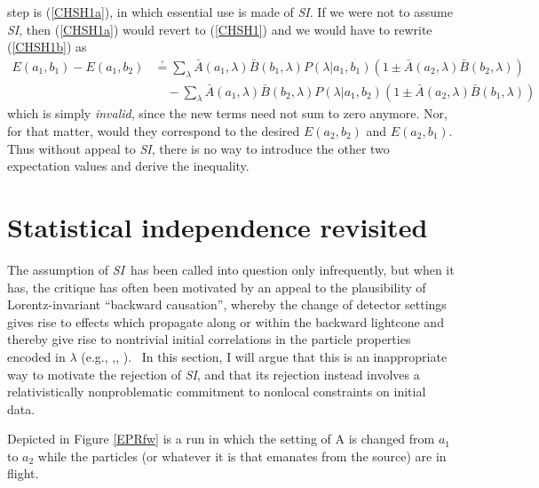 \documentclass[12pt]{article}%
\begin{document}
step is (\ref{CHSH1a}), in which essential use is made of \emph{SI}. If we
were not to assume \emph{SI}, then (\ref{CHSH1a}) would revert to
(\ref{CHSH1}) and we would have to rewrite (\ref{CHSH1b}) as
\begin{align}
E(a_{1},b_{1})-E(a_{1},b_{2})%
& \stackrel{_?}{=} %
{\displaystyle\sum\limits_{\lambda}}
\bar{A}(a_{1},\lambda)\bar{B}(b_{1},\lambda)P(\lambda|a_{1},b_{1})(1\pm\bar
{A}(a_{2},\lambda)\bar{B}(b_{2},\lambda))\nonumber\\
& \quad - 
{\displaystyle\sum\limits_{\lambda}}
\bar{A}(a_{1},\lambda)\bar{B}(b_{2},\lambda)P(\lambda|a_{1},b_{2})(1\pm\bar
{A}(a_{2},\lambda)\bar{B}(b_{1},\lambda))
\label{CHSH2b}%
\end{align}
which is simply \emph{invalid}, since the new terms need not sum to zero
anymore. Nor, for that matter, would they correspond to the desired
$E(a_{2},b_{2})$ and $E(a_{2},b_{1})$. Thus without appeal to \emph{SI}, there
is no way to introduce the other two expectation values and derive the inequality.

\section{Statistical independence revisited}

The assumption of \emph{SI}\ has been called into question only infrequently,
but when it has, the critique has often been motivated by an appeal to the
plausibility of Lorentz-invariant \textquotedblleft backward
causation\textquotedblright, whereby the change of detector settings gives
rise to effects which propagate along or within the backward lightcone and
thereby give rise to nontrivial initial correlations in the particle
properties encoded in $\lambda$ (e.g., \cite{Cos78},\cite{Suth83},
\cite{Pri96}). \ In this section, I will argue that this is an inappropriate
way to motivate the rejection of \emph{SI}, and that its rejection instead
involves a relativistically nonproblematic commitment to nonlocal constraints
on initial data.

Depicted in Figure \ref{EPRfw} is a run in which the setting of A is changed
from $a_{1}$ to $a_{2}$ while the particles (or whatever it is that emanates
from the source) are in flight.%
\end{document}
